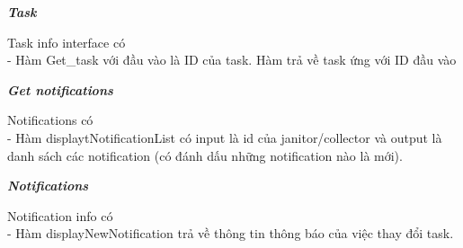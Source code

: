 \documentclass[a4paper]{article}
\begin{document}
\begin{itemize}
\newline
\newline
\textbf{    \textit{Task} } \\
\begin{minipage}[b]{0.4\textwidth}
Task info interface có \\
- Hàm Get\_task với đầu vào là ID của task. Hàm trả về task ứng với ID đầu vào
\end{minipage}
\hfill
{}
\newline
\newline
\textbf{    \textit{Get notifications } } \\
\begin{minipage}[b]{0.4\textwidth}
Notifications có\\
- Hàm displaytNotificationList có input là id của janitor/collector và output là danh sách các notification (có đánh dấu những notification nào là mới).
\end{minipage}
\hfill
{}
\newline
\newline
\textbf{    \textit{Notifications } } \\
\begin{minipage}[b]{0.4\textwidth}
Notification info có\\
- Hàm displayNewNotification trả về thông tin thông báo của việc thay đổi task.
\end{minipage}
\hfill
{}
\newline
\newline

\end{itemize}
\end{document}
